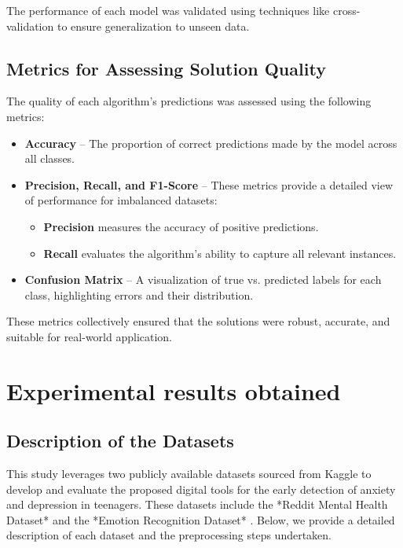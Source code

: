 \documentclass[runningheads,a4paper,11pt]{report}
\begin{document}
The performance of each model was validated using techniques like cross-validation to ensure generalization to unseen data.

\section{Metrics for Assessing Solution Quality}
\label{section:metrics_quality}

The quality of each algorithm's predictions was assessed using the following metrics:
\begin{itemize}
    \item \textbf{Accuracy} -- The proportion of correct predictions made by the model across all classes.
    \item \textbf{Precision, Recall, and F1-Score} -- These metrics provide a detailed view of performance for imbalanced datasets:
    \begin{itemize}
        \item \textbf{Precision} measures the accuracy of positive predictions.
        \item \textbf{Recall} evaluates the algorithm's ability to capture all relevant instances.
    \end{itemize}
    \item \textbf{Confusion Matrix} -- A visualization of true vs. predicted labels for each class, highlighting errors and their distribution.
    
\end{itemize}

These metrics collectively ensured that the solutions were robust, accurate, and suitable for real-world application.



\chapter{Experimental results obtained}
\label{chapter:experimental-results}

\section{Description of the Datasets}
\label{section:description}
This study leverages two publicly available datasets sourced from Kaggle to develop and evaluate the proposed digital tools for the early detection of anxiety and depression in teenagers. These datasets include the *Reddit Mental Health Dataset* \cite{reddit_dataset} and the *Emotion Recognition Dataset* \cite{emotion_dataset}. Below, we provide a detailed description of each dataset and the preprocessing steps undertaken.
\end{document}
